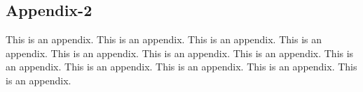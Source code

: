 \subsection{Appendix-2}
This is an appendix. This is an appendix. This is an appendix. This is an appendix. This is an appendix. This is an appendix. This is an appendix. This is an appendix. This is an appendix. This is an appendix. This is an appendix. This is an appendix.